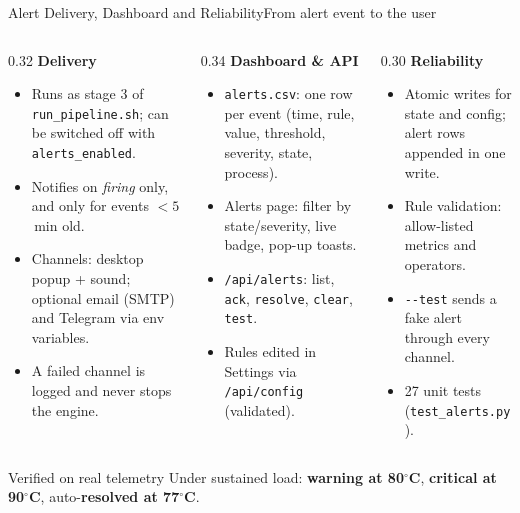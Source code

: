 \documentclass[aspectratio=169,10pt]{beamer}
\begin{document}
{%
\begin{frame}{Alert Delivery, Dashboard and Reliability}{From alert event to the user}
\footnotesize
\begin{columns}[T]
\begin{column}{0.32\textwidth}
\textbf{Delivery}
\begin{itemize}
  \item Runs as stage 3 of \texttt{run\_pipeline.sh}; can be switched off with \texttt{alerts\_enabled}.
  \item Notifies on \textit{firing} only, and only for events $<5$\,min old.
  \item Channels: desktop popup + sound; optional email (SMTP) and Telegram via env variables.
  \item A failed channel is logged and never stops the engine.
\end{itemize}
\end{column}
\begin{column}{0.34\textwidth}
\textbf{Dashboard \& API}
\begin{itemize}
  \item \texttt{alerts.csv}: one row per event (time, rule, value, threshold, severity, state, process).
  \item Alerts page: filter by state/severity, live badge, pop-up toasts.
  \item \texttt{/api/alerts}: list, \texttt{ack}, \texttt{resolve}, \texttt{clear}, \texttt{test}.
  \item Rules edited in Settings via \texttt{/api/config} (validated).
\end{itemize}
\end{column}
\begin{column}{0.30\textwidth}
\textbf{Reliability}
\begin{itemize}
  \item Atomic writes for state and config; alert rows appended in one write.
  \item Rule validation: allow-listed metrics and operators.
  \item \texttt{-{}-test} sends a fake alert through every channel.
  \item 27 unit tests (\texttt{test\_alerts.py}).
\end{itemize}
\end{column}
\end{columns}

\vspace{0.4em}
\begin{block}{Verified on real telemetry}
Under sustained load: \textbf{warning at 80$^\circ$C}, \textbf{critical at 90$^\circ$C}, auto-\textbf{resolved at 77$^\circ$C}.
\end{block}
\end{frame}
}
\end{document}
